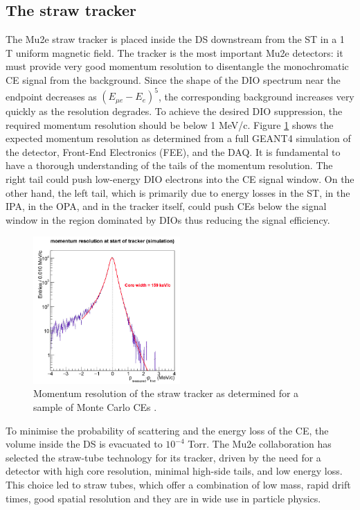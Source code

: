 \subsection{The straw tracker}\label{trackersec}
The Mu2e straw tracker is placed inside the DS downstream from 
the ST in a 1 T uniform magnetic field. The tracker is the most 
important Mu2e detectors: it must provide very good momentum resolution to 
disentangle the monochromatic CE signal from the background. 
Since the shape of the DIO spectrum near the endpoint decreases as 
$(E_{\mu e} -E_e)^5$, the corresponding background increases very quickly as the resolution
degrades. To achieve the desired DIO suppression, the required momentum resolution should be below 1 MeV/c.  
Figure \ref{fig:trkres} shows the expected momentum resolution as determined 
from a full GEANT4 simulation of the detector, Front-End Electronics (FEE), and the DAQ.
It is fundamental to have a thorough understanding of the tails of the momentum resolution. 
The right tail could push low-energy DIO electrons into the CE signal window. 
On the other hand, the left tail, which is primarily due to energy losses in the ST, 
in the IPA, in the OPA, and in the tracker itself, could 
push CEs below the signal window in the region dominated by DIOs 
thus reducing the signal efficiency.
\begin{figure}[!h]
    \centering
    \includegraphics[width =0.5\textwidth]{figures/png/Screenshot_20240330_104830.png}
    \caption[The momentum resolution of the straw tracker.]{Momentum resolution of the straw tracker as determined for 
    a sample of Monte Carlo CEs \cite{bobbb}.}
    \label{fig:trkres}
    \end{figure} 
To minimise the probability of scattering and the energy loss of the CE, 
the volume inside the DS is evacuated to $10^{-4}$ Torr. 
The Mu2e collaboration has selected the straw-tube 
technology \cite{bobbb} for its tracker, driven by the need for 
a detector with high core resolution, minimal high-side tails, 
and low energy loss. This choice led to straw tubes, which 
offer a combination of low mass, rapid drift times, good spatial 
resolution and they are in wide use in particle physics. 

